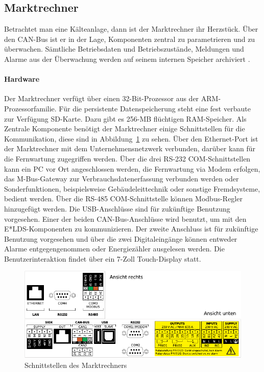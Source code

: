 \documentclass[11pt,a4paper]{report}
\begin{document}
\subsection{Marktrechner} \label{sec:marktrechner} 
Betrachtet man eine Kälteanlage, dann ist der Marktrechner ihr Herzstück. Über den CAN-Bus ist er in der Lage, Komponenten zentral zu parametrieren und zu überwachen. Sämtliche Betriebsdaten und Betriebszustände, Meldungen und Alarme aus der Überwachung werden auf seinem internen Speicher archiviert \cite{elds}.

\paragraph{Hardware} Der Marktrechner verfügt über einen 32-Bit-Prozessor aus der ARM-Prozessorfamilie. Für die persistente Datenspeicherung steht eine fest verbaute zur Verfügung SD-Karte. Dazu gibt es 256-MB flüchtigen RAM-Speicher. Als Zentrale Komponente benötigt der Marktrechner einige Schnittstellen für die Kommunikation, diese sind in Abbildung~\ref{fig:marktrechner_interfaces} zu sehen. Über den Ethernet-Port ist der Marktrechner mit dem Unternehmensnetzwerk verbunden, darüber kann für die Fernwartung zugegriffen werden. Über die drei RS-232 COM-Schnittstellen kann ein PC vor Ort angeschlossen werden, die Fernwartung via Modem erfolgen, das M-Bus-Gateway zur Verbrauchsdatenerfassung verbunden werden oder Sonderfunktionen, beispielsweise Gebäudeleittechnik oder sonstige Fremdsysteme, bedient werden. Über die RS-485 COM-Schnittstelle können Modbus-Regler hinzugefügt werden. Die USB-Anschlüsse sind für zukünftige Benutzung vorgesehen. Einer der beiden CAN-Bus-Anschlüsse wird benutzt, um mit den E*LDS-Komponenten zu kommunizieren. Der zweite Anschluss ist für zukünftige Benutzung vorgesehen und über die zwei Digitaleingänge können entweder Alarme entgegengenommen oder Energiezähler ausgelesen werden. Die Benutzerinteraktion findet über ein 7-Zoll Touch-Display statt.

\begin{figure}[htbp]
\centering
\includegraphics[scale=1.1]{images/CI4000_Hardware_Sticker.pdf}
\caption{Schnittstellen des Marktrechners}
\label{fig:marktrechner_interfaces}
\end{figure}
\end{document}
